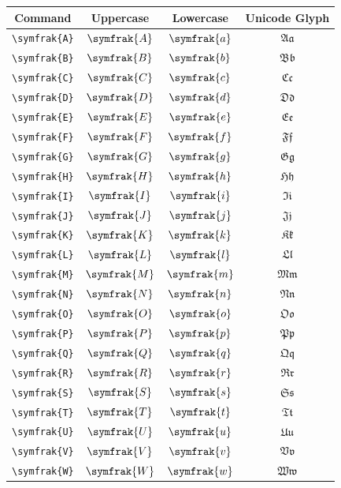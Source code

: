 \documentclass[12pt,a4paper]{article}
\begin{document}
\begin{longtable}{|c|c|c|c|}
\hline
\textbf{Command} & \textbf{Uppercase} & \textbf{Lowercase} & \textbf{Unicode Glyph} \\
\hline
\verb|\symfrak{A}| & $\symfrak{A}$ & $\symfrak{a}$ & $ 𝔄 𝔞 $ \\
\verb|\symfrak{B}| & $\symfrak{B}$ & $\symfrak{b}$ & $ 𝔅 𝔟 $ \\
\verb|\symfrak{C}| & $\symfrak{C}$ & $\symfrak{c}$ & $ ℭ 𝔠 $ \\
\verb|\symfrak{D}| & $\symfrak{D}$ & $\symfrak{d}$ & $ 𝔇 𝔡 $ \\
\verb|\symfrak{E}| & $\symfrak{E}$ & $\symfrak{e}$ & $ 𝔈 𝔢 $ \\
\verb|\symfrak{F}| & $\symfrak{F}$ & $\symfrak{f}$ & $ 𝔉 𝔣 $ \\
\verb|\symfrak{G}| & $\symfrak{G}$ & $\symfrak{g}$ & $ 𝔊 𝔤 $ \\
\verb|\symfrak{H}| & $\symfrak{H}$ & $\symfrak{h}$ & $ ℌ 𝔥 $ \\
\verb|\symfrak{I}| & $\symfrak{I}$ & $\symfrak{i}$ & $ ℑ 𝔦 $ \\
\verb|\symfrak{J}| & $\symfrak{J}$ & $\symfrak{j}$ & $ 𝔍 𝔧 $ \\
\verb|\symfrak{K}| & $\symfrak{K}$ & $\symfrak{k}$ & $ 𝔎 𝔨 $ \\
\verb|\symfrak{L}| & $\symfrak{L}$ & $\symfrak{l}$ & $ 𝔏 𝔩 $ \\
\verb|\symfrak{M}| & $\symfrak{M}$ & $\symfrak{m}$ & $ 𝔐 𝔪 $ \\
\verb|\symfrak{N}| & $\symfrak{N}$ & $\symfrak{n}$ & $ 𝔑 𝔫 $ \\
\verb|\symfrak{O}| & $\symfrak{O}$ & $\symfrak{o}$ & $ 𝔒 𝔬 $ \\
\verb|\symfrak{P}| & $\symfrak{P}$ & $\symfrak{p}$ & $ 𝔓 𝔭 $ \\
\verb|\symfrak{Q}| & $\symfrak{Q}$ & $\symfrak{q}$ & $ 𝔔 𝔮 $ \\
\verb|\symfrak{R}| & $\symfrak{R}$ & $\symfrak{r}$ & $ ℜ 𝔯 $ \\
\verb|\symfrak{S}| & $\symfrak{S}$ & $\symfrak{s}$ & $ 𝔖 𝔰 $ \\
\verb|\symfrak{T}| & $\symfrak{T}$ & $\symfrak{t}$ & $ 𝔗 𝔱 $ \\
\verb|\symfrak{U}| & $\symfrak{U}$ & $\symfrak{u}$ & $ 𝔘 𝔲 $ \\
\verb|\symfrak{V}| & $\symfrak{V}$ & $\symfrak{v}$ & $ 𝔙 𝔳 $ \\
\verb|\symfrak{W}| & $\symfrak{W}$ & $\symfrak{w}$ & $ 𝔚 𝔴 $ \\

\end{longtable}
\end{document}
